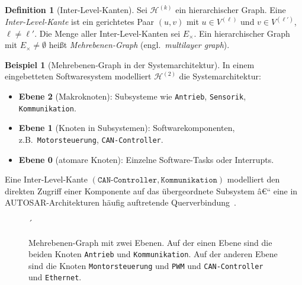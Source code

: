﻿\documentclass[12pt,a4paper,twoside]{article}
\theoremstyle{definition}
\newtheorem{definition}{Definition}[section]
\newtheorem{beispiel}{Beispiel}[section]
\theoremstyle{plain}
\theoremstyle{remark}
\begin{document}
\begin{definition}[Inter-Level-Kanten]
	\label{def:interlevel}
	Sei $\mathcal{H}^{(k)}$ ein hierarchischer Graph.  Eine
	\emph{Inter-Level-Kante} ist ein gerichtetes Paar $(u, v)$ mit
	$u \in V^{(\ell)}$ und $v \in V^{(\ell')}$, $\ell \neq \ell'$.
	Die Menge aller Inter-Level-Kanten sei $E_{\times}$.  Ein
	hierarchischer Graph mit $E_{\times} \neq \emptyset$ heißt
	\emph{Mehrebenen-Graph} (engl.\ \emph{multilayer graph}).
\end{definition}

\begin{beispiel}[Mehrebenen-Graph in der Systemarchitektur]
	In einem eingebetteten Softwaresystem modelliert $\mathcal{H}^{(2)}$
	die Systemarchitektur:
	\begin{itemize}
		\item \textbf{Ebene 2} (Makroknoten): Subsysteme wie
		\texttt{Antrieb}, \texttt{Sensorik}, \texttt{Kommunikation}.
		\item \textbf{Ebene 1} (Knoten in Subsystemen): Softwarekomponenten,
		z.B.\ \texttt{Motorsteuerung}, \texttt{CAN-Controller}.
		\item \textbf{Ebene 0} (atomare Knoten): Einzelne Software-Tasks
		oder Interrupts.
	\end{itemize}
	Eine Inter-Level-Kante $(\texttt{CAN-Controller}, \texttt{Kommunikation})$
	modelliert den direkten Zugriff einer Komponente auf das übergeordnete
	Subsystem â€“ eine in AUTOSAR-Architekturen häufig auftretende
	Querverbindung~\cite{West2001}.
\end{beispiel}

\begin{figure}[h]
	\centering
	\caption{Mehrebenen-Graph mit zwei Ebenen. Auf der einen Ebene sind die beiden Knoten \texttt{Antrieb} und \texttt{Kommunikation}. Auf der anderen Ebene sind die Knoten \texttt{Montorsteuerung} und \texttt{PWM} und \texttt{CAN-Controller} und \texttt{Ethernet}.} ´
	\label{fig:interlevel}
\end{figure}
\end{document}
